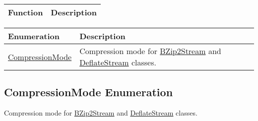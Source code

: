 \documentclass[a4paper,oneside,11.000000pt]{book}
\newcounter{subchapter}
\begin{document}
\begin{flushleft}
\begin{supertabular}[l]{ll}
\textbf{Function}
& \textbf{Description}
\\
\hline
\end{supertabular}

\end{flushleft}
\clearpage
\clearpage
{}
\begin{flushleft}
\begin{supertabular}[l]{!{\raggedright}p{4.18998cm}!{\raggedright}p{10.96cm}}
\textbf{Enumeration}
& \textbf{Description}
\\
\hline
\hyperlink{System.IO.Compression.CompressionMode}{CompressionMode}
& Compression mode for \hyperlink{System.IO.Compression.BZip2Stream}{BZip2Stream} and \hyperlink{System.IO.Compression.DeflateStream}{DeflateStream} classes.

\\
\end{supertabular}

\end{flushleft}
\clearpage

\hypertarget{System.IO.Compression.CompressionMode}{\subsection{CompressionMode Enumeration}}
\begin{flushleft}
Compression mode for \hyperlink{System.IO.Compression.BZip2Stream}{BZip2Stream} and \hyperlink{System.IO.Compression.DeflateStream}{DeflateStream} classes.

\end{flushleft}
\end{document}
